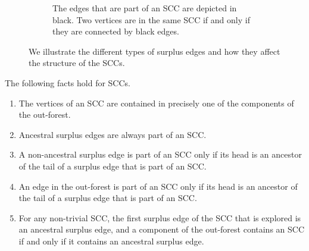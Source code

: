 \begin{figure}
\begin{subfigure}{0.8\textwidth}
  \caption{The edges that are part of an SCC are depicted in black. Two vertices are in the same SCC if and only if they are connected by black edges. }
    \label{subfigure.sccinexample}
\end{subfigure}
\caption{We illustrate the different types of surplus edges and how they affect the structure of the SCCs.}
\end{figure}

\begin{lemma}\label{lem:whatispartofscc}
The following facts hold for SCCs. 
\begin{enumerate}
\item \label{item.factsonsccs1}The vertices of an SCC are contained in precisely one of the components of the out-forest. 
\item \label{item.factsonsccs2} Ancestral surplus edges are always part of an SCC.
\item \label{item.factsonsccs4} A non-ancestral surplus edge is part of an SCC only if its head is an ancestor of the tail of a surplus edge that is part of an SCC.
\item \label{item.factsonsccs4andabit} An edge in the out-forest is part of an SCC only if its head is an ancestor of the tail of a surplus edge that is part of an SCC.
\item \label{item.factsonsccs5} For any non-trivial SCC, the first surplus edge of the SCC that is explored is an ancestral surplus edge, and a component of the out-forest contains an SCC if and only if it contains an ancestral surplus edge.
\end{enumerate}
\end{lemma}
